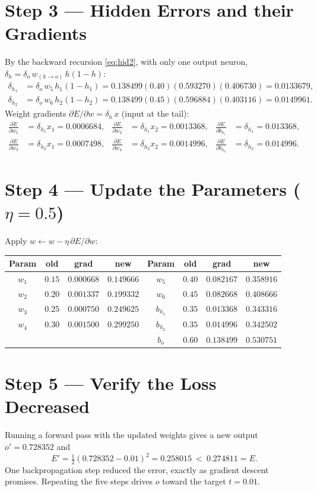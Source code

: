\documentclass[11pt,a4paper]{report}
\theoremstyle{definition}
\theoremstyle{remark}
\newcommand{\pd}[2]{\frac{\partial #1}{\partial #2}}
\begin{document}
\section{Step 3 --- Hidden Errors and their Gradients}
By the backward recursion \eqref{eq:hid2}, with only one output neuron,
$\delta_{h}=\delta_o\,w_{(h\to o)}\,h(1-h)$:
\begin{align*}
\delta_{h_1}&=\delta_o\,w_5\,h_1(1-h_1)=0.138499(0.40)(0.593270)(0.406730)=0.0133679,\\
\delta_{h_2}&=\delta_o\,w_6\,h_2(1-h_2)=0.138499(0.45)(0.596884)(0.403116)=0.0149961.
\end{align*}
Weight gradients $\partial E/\partial w=\delta_h\,x$ (input at the tail):
\[
\begin{aligned}
\pd{E}{w_1}&=\delta_{h_1}x_1=0.0006684, & \pd{E}{w_2}&=\delta_{h_1}x_2=0.0013368, & \pd{E}{b_{h_1}}&=\delta_{h_1}=0.013368,\\
\pd{E}{w_3}&=\delta_{h_2}x_1=0.0007498, & \pd{E}{w_4}&=\delta_{h_2}x_2=0.0014996, & \pd{E}{b_{h_2}}&=\delta_{h_2}=0.014996.
\end{aligned}
\]

\section{Step 4 --- Update the Parameters ($\eta=0.5$)}
Apply $w\leftarrow w-\eta\,\partial E/\partial w$:
\begin{center}
\renewcommand{\arraystretch}{1.2}
\begin{tabular}{@{}cccc|cccc@{}}
\toprule
Param & old & grad & new & Param & old & grad & new\\
\midrule
$w_1$ & $0.15$ & $0.000668$ & $0.149666$ & $w_5$ & $0.40$ & $0.082167$ & $0.358916$\\
$w_2$ & $0.20$ & $0.001337$ & $0.199332$ & $w_6$ & $0.45$ & $0.082668$ & $0.408666$\\
$w_3$ & $0.25$ & $0.000750$ & $0.249625$ & $b_{h_1}$ & $0.35$ & $0.013368$ & $0.343316$\\
$w_4$ & $0.30$ & $0.001500$ & $0.299250$ & $b_{h_2}$ & $0.35$ & $0.014996$ & $0.342502$\\
      &        &            &            & $b_o$ & $0.60$ & $0.138499$ & $0.530751$\\
\bottomrule
\end{tabular}
\end{center}

\section{Step 5 --- Verify the Loss Decreased}
Running a forward pass with the updated weights gives a new output
$o'=0.728352$ and
\[
E'=\tfrac12(0.728352-0.01)^2=0.258015\ <\ 0.274811=E.
\]
One backpropagation step reduced the error, exactly as gradient descent
promises. Repeating the five steps drives $o$ toward the target $t=0.01$.
\end{document}
